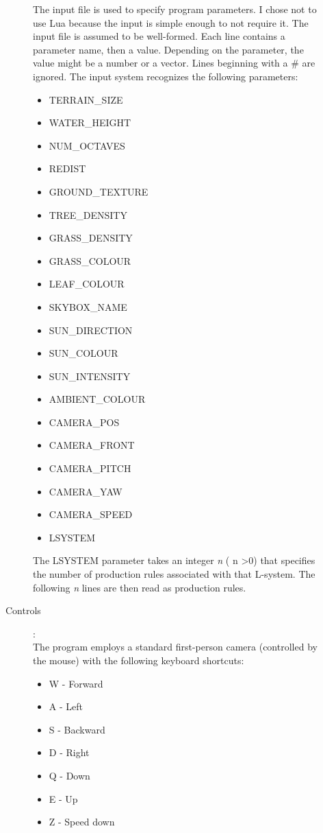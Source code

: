 \documentclass{article}
\begin{document}
\begin{description}
\begin{description}
		The input file is used to specify program parameters. I chose not to use Lua because the input is simple enough to not require it.
		The input file is assumed to be well-formed. Each line contains a parameter name, then a value. Depending on the parameter, the value might be a number or a vector. Lines beginning with a \# are ignored.
		The input system recognizes the following parameters:
		\begin{itemize}
			\item TERRAIN\_SIZE
			\item WATER\_HEIGHT
			\item NUM\_OCTAVES
			\item REDIST
			\item GROUND\_TEXTURE
			\item TREE\_DENSITY
			\item GRASS\_DENSITY
			\item GRASS\_COLOUR
			\item LEAF\_COLOUR
			\item SKYBOX\_NAME
			\item SUN\_DIRECTION
			\item SUN\_COLOUR
			\item SUN\_INTENSITY
			\item AMBIENT\_COLOUR
			\item CAMERA\_POS
			\item CAMERA\_FRONT
			\item CAMERA\_PITCH
			\item CAMERA\_YAW
			\item CAMERA\_SPEED
			\item LSYSTEM
		\end{itemize}
		The LSYSTEM parameter takes an integer \textit{n} ( n \textgreater 0) that specifies the number of production rules associated with that L-system. The following \textit{n} lines are then read as production rules.
	\item[Controls]:\\
		The program employs a standard first-person camera (controlled by the mouse) with the following keyboard shortcuts:
		\begin{itemize}
			\item W - Forward
			\item A - Left
			\item S - Backward
			\item D - Right
			\item Q - Down
			\item E - Up
			\item Z - Speed down

\end{itemize}
\end{description}
\end{description}
\end{document}
